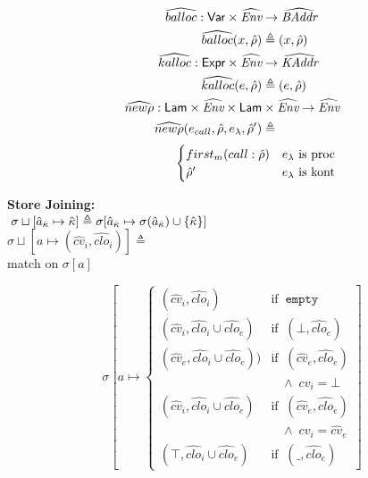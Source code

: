 \documentclass[12pt,draft]{article}
\newcommand{\store}[0]{\sigma}
\begin{document}
\begin{multicols*}{2}
  \vspace{-7mm}
  \begin{align*}
    \widehat{balloc}:\textsf{Var} \times \widehat{\textit{Env}} &\rightarrow \widehat{\textit{BAddr}} \\
    \widehat{balloc}(x, \hat{\rho}) &\triangleq (x, \hat{\rho}) \\
    \widehat{kalloc}:\textsf{Expr} \times \widehat{\textit{Env}} &\rightarrow \widehat{\textit{KAddr}} \\
    \widehat{kalloc}(e, \hat{\rho}) &\triangleq (e, \hat{\rho}) \\
    \widehat{new\rho}:\textsf{Lam} \times \widehat{\textit{Env}}
    \times \textsf{Lam} &\times \widehat{\textit{Env}}
                          \rightarrow \widehat{\textit{Env}} \\
    \widehat{new\rho}(e_{call} , \hat{\rho} , e_{\lambda} , \hat{\rho}') &\triangleq
  \end{align*}
  \vspace{-6mm}
  \[
    \;\;\;\;\;\;\;\;\;\;\;\;\;\;\begin{cases}
      first_m(call:\hat{\rho}) & e_{\lambda}\text{ is proc}\\
      \hat{\rho}' & e_{\lambda}\text{ is kont}
    \end{cases}
  \]
  \begin{center}
    \textbf{Store Joining:} \\
    $\;\store \sqcup [\akaddr \mapsto \akont]
    \triangleq \store[\akaddr \mapsto \store(\akaddr) \cup \{\akont\}]$ \\
    $\store \sqcup [a \mapsto (\hat{cv}_i, \widehat{clo}_i)] \triangleq$ \\
    match on $\store[a]$
  \end{center}
  \[
    \store[a \mapsto \begin{cases}
      (\hat{cv}_i, \widehat{clo}_i)
      & \text{if}\;\; \texttt{empty} \\
      (\hat{cv}_i , \widehat{clo}_i \cup \widehat{clo}_e)
      & \text{if}\;\; (\bot, \widehat{clo}_e) \\
      (\hat{cv}_e , \widehat{clo}_i \cup \widehat{clo}_e))
      & \text{if}\;\; (\hat{cv}_e, \widehat{clo}_e) \\
      &\;\;\; \land \; \hat{cv}_i = \bot \\
      (\hat{cv}_i , \widehat{clo}_i \cup \widehat{clo}_e)
      & \text{if}\;\; (\hat{cv}_e , \widehat{clo}_e) \\
      &\;\;\; \land \; \hat{cv}_i = \hat{cv}_e \\
      (\top , \widehat{clo}_i \cup \widehat{clo}_e)
      & \text{if}\;\; (\_, \widehat{clo}_e)
    \end{cases}]
  \]
\end{multicols*}
\end{document}
